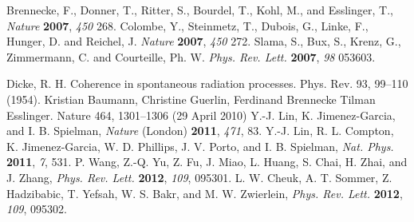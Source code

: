 \documentclass[atoms,article,submit,moreauthors,pdftex,12pt,a4paper]{mdpi}
\begin{document}
\begin{thebibliography}{999}
Brennecke, F., Donner, T., Ritter, S., Bourdel, T., Kohl, M., and Esslinger, T., {\em Nature} {\bf 2007}, {\em 450} 268.
Colombe, Y., Steinmetz, T., Dubois, G., Linke, F., Hunger, D. and Reichel, J. {\em Nature} {\bf 2007}, {\em 450} 272.
Slama, S., Bux, S., Krenz, G., Zimmermann, C. and Courteille, Ph. W. {\em Phys. Rev. Lett.} {\bf 2007}, {\em 98} 053603.
\begin{comment}
\bibitem{cavity4}
J. M. Raimond, M. Brune, and S. Haroche, {\em Rev. Mod. Phys.} {\bf 2001}, {\em 73}, 565.
\bibitem{cavity5}
R. Miller, T. E. Northup, K. M. Birnbaum, A. Boca, A. D. Boozer, and H. J. Kimble, {\em J. Phys. B} {\bf 2005}, {\em 38}, S551.
\bibitem{cavity6}
H. Walther, B. T. H. Varcoe, B.-G. Englert, and T. Becker, {\em Rep. Prog. Phys.} {\bf 2006}, {\em 69}, 1325.
\bibitem{cavity7}
F. Brennecke, T. Donner, S. Ritter, T. Bourdel, M. Köhl, and T. Esslinger, {\em Nature} (London) {\bf 2007}, {\em 450}, 268.
\bibitem{cavity8}
Y. Colombe, T. Steinmetz, G. Dubois, F. Linke, D. Hunger, and J. Reichel, {\em Nature} (London) {\bf 2007}, {\em 450}, 272.
\bibitem{cavity9}
S. Slama, S. Bux, G. Krenz, C. Zimmermann, and Ph. W. Courteille, {\em Phys. Rev. Lett.} {\bf 2007}, {\em 98}, 053603.
\bibitem{cavity10}
D. Schmidt, H. Tomczyk, S. Slama, and C. Zimmermann, arXiv:1311.2156 (2013).
\bibitem{cavity11}
S. Gupta, K. L. Moore, K. W. Murch, and D. M. Stamper-Kurn, {\em Phys. Rev. Lett.} {\bf 2007}, {\em 99}, 213601.
\bibitem{cavity12}
M. Lewenstein, A. Sanpera, V. Ahufinger, B. Damski, A. Sen De, and U. Sen, {\em Adv. Phys.} {\bf 2007}, {\em 56}, 243.
\bibitem{cavity13}
I. B. Mekhov and H. Ritsch, {\em J. Phys. B} {\bf 2012}, {\em 45}, 102001.
\end{comment}
Dicke, R. H. Coherence in spontaneous radiation processes. Phys. Rev. 93, 99–110 (1954).
  Kristian Baumann,
  Christine Guerlin,
  Ferdinand Brennecke
 Tilman Esslinger.     Nature
    464,
    1301–1306
    (29 April 2010)
Y.-J. Lin, K. Jimenez-Garcia, and I. B. Spielman, {\em Nature} (London) {\bf 2011}, {\em 471}, 83.
Y.-J. Lin, R. L. Compton, K. Jimenez-Garcia, W. D. Phillips, J. V. Porto, and I. B. Spielman, {\em Nat. Phys.} {\bf 2011}, {\em 7}, 531.
P. Wang, Z.-Q. Yu, Z. Fu, J. Miao, L. Huang, S. Chai, H. Zhai, and J. Zhang, {\em Phys. Rev. Lett.} {\bf 2012}, {\em 109}, 095301.
L. W. Cheuk, A. T. Sommer, Z. Hadzibabic, T. Yefsah, W. S. Bakr, and M. W. Zwierlein, {\em Phys. Rev. Lett.} {\bf 2012}, {\em 109}, 095302.

\end{thebibliography}
\end{document}
